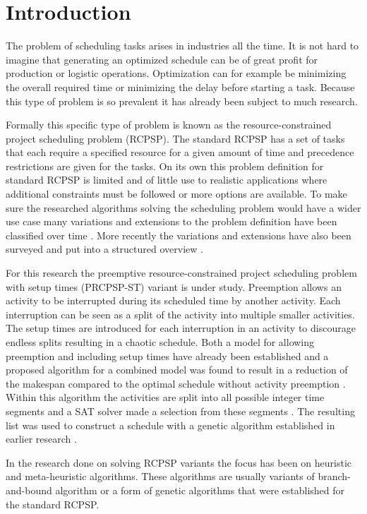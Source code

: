 \section{Introduction}
The problem of scheduling tasks arises in industries all the time. It is not hard to imagine that generating an optimized schedule can be of great profit for production or logistic operations. Optimization can for example be minimizing the overall required time or minimizing the delay before starting a task. Because this type of problem is so prevalent it has already been subject to much research.

Formally this specific type of problem is known as the resource-constrained project scheduling problem (RCPSP). The standard RCPSP has a set of tasks that each require a specified resource for a given amount of time and precedence restrictions are given for the tasks. On its own this problem definition for standard RCPSP is limited and of little use to realistic applications where additional constraints must be followed or more options are available.
To make sure the researched algorithms solving the scheduling problem would have a wider use case many variations and extensions to the problem definition have been classified over time \cite{RN9} \cite{RN10}. More recently the variations and extensions have also been surveyed and put into a structured overview \cite{RN6}.

For this research the preemptive resource-constrained project scheduling problem with setup times (PRCPSP-ST) variant is under study. Preemption allows an activity to be interrupted during its scheduled time by another activity. Each interruption can be seen as a split of the activity into multiple smaller activities. The setup times are introduced for each interruption in an activity to discourage endless splits resulting in a chaotic schedule. Both a model for allowing preemption \cite{RN21} and including setup times \cite{RN13} have already been established and a proposed algorithm for a combined model was found to result in a reduction of the makespan compared to the optimal schedule without activity preemption \cite{RN1}. Within this algorithm the activities are split into all possible integer time segments and a SAT solver made a selection from these segments \cite{RN3}. The resulting list was used to construct a schedule with a genetic algorithm established in earlier research \cite{RN14}.

In the research done on solving RCPSP variants the focus has been on heuristic and meta-heuristic algorithms. These algorithms are usually variants of branch-and-bound algorithm \cite{RN21} or a form of genetic algorithms \cite{RN28} that were established for the standard RCPSP.


